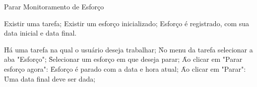\begin{funcionalidade}{Parar Monitoramento de Esforço}



	\condicao
	{
		Existir uma tarefa;\newline
		Existir um esforço inicializado;
	} %
	{Esforço é registrado, com sua data inicial e data final.} %

	\begin{fluxo}
		\f Há uma tarefa na qual o usuário deseja trabalhar;
		\f No menu da tarefa selecionar a aba "Esforço";
			\subf
			\f Selecionar um esforço em que deseja parar;
			\f Ao clicar em "Parar esforço agora":
				\subf
				\f Esforço é parado com a data e hora atual;
				\voltaf
			\f Ao clicar em "Parar":
				\subf
				\f Uma data final deve ser dada;
				\voltaf
			\voltaf
	\end{fluxo}


\end{funcionalidade}
